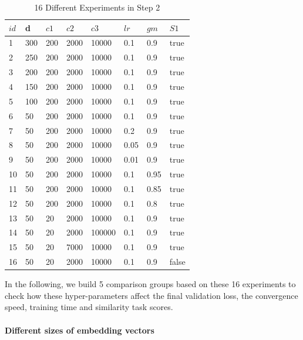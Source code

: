 \begin{table}[tb]

\caption{16 Different Experiments in Step 2} \label{tab:experiment16}
\begin{center}
\begin{tabular}{|l|l|l|l|l|l|l|l|}
\hline
$id$&\gls{d}&$c1$&$c2$&$c3$&$lr$&$gm$&$S1$ \\ \hline
1 	& 300	&  200 	& 2000 & 10000 	& 0.1		& 0.9	& true \\ \hline
2	& 250   &  200	& 2000 & 10000 	& 0.1		& 0.9	& true \\ \hline
3	& 200   &  200	& 2000 & 10000 	& 0.1		& 0.9	& true \\ \hline
4	& 150   &  200	& 2000 & 10000 	& 0.1		& 0.9	& true \\ \hline
5 	& 100 	&  200 	& 2000 & 10000 	& 0.1		& 0.9	& true  \\ \hline
6 	& 50 	&  200 	& 2000 & 10000 	& 0.1		& 0.9	& true \\ \hline
7 	& 50 	&  200 	& 2000 & 10000 	& 0.2		& 0.9	& true \\ \hline
8 	& 50 	&  200 	& 2000 & 10000 	& 0.05		& 0.9	& true \\ \hline
9 	& 50 	&  200 	& 2000 & 10000 	& 0.01		& 0.9	& true \\ \hline
10 	& 50 	&  200 	& 2000 & 10000 	& 0.1		& 0.95	& true \\ \hline
11 	& 50 	&  200 	& 2000 & 10000 	& 0.1		& 0.85	& true \\ \hline
12 	& 50 	&  200 	& 2000 & 10000 	& 0.1		& 0.8	& true \\ \hline
13	& 50		&  20	& 2000 & 10000	& 0.1		& 0.9	& true \\  \hline
14 	& 50 	&  20	& 2000 & 100000 	& 0.1		& 0.9	& true \\ \hline
15 	& 50 	&  20	& 7000 & 10000 	& 0.1		& 0.9	& true \\ \hline
16 	& 50 	&  20	& 2000 & 10000 	& 0.1		& 0.9	& false\\ \hline
\end{tabular}

\end{center}
\end{table}

In the following, we build 5 comparison groups based on these 16 experiments to check how these hyper-parameters affect the final validation loss, the convergence speed, training time and similarity task scores. 

\paragraph{Different sizes of embedding vectors} \ 

